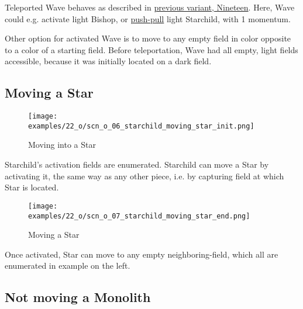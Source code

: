 Teleported Wave behaves as described in
\hyperref[fig:scn_n_04_teleport_move_3]{previous variant, Nineteen}.
Here, Wave could e.g. activate light Bishop, or
\hyperref[sec:Terms/Push-pull activation]{push-pull} light Starchild, with 1 momentum.

Other option for activated Wave is to move to any empty field in color opposite to a
color of a starting field. Before teleportation, Wave had all empty, light fields
accessible, because it was initially located on a dark field.

\clearpage %

\subsection*{Moving a Star}

\vspace*{-0.9\baselineskip}
\noindent
\begin{wrapfigure}[5]{l}{0.4\textwidth}
\centering
\texttt{[image: examples/22\_o/scn\_o\_06\_starchild\_moving\_star\_init.png]}
\caption{Moving into a Star}
\label{fig:scn_o_06_starchild_moving_star_init}
\end{wrapfigure}
Starchild's activation fields are enumerated. Starchild can move a Star by activating it,
the same way as any other piece, i.e. by capturing field at which Star is located.

\vspace*{2.1\baselineskip}
\noindent
\begin{wrapfigure}[4]{l}{0.4\textwidth}
\centering
\texttt{[image: examples/22\_o/scn\_o\_07\_starchild\_moving\_star\_end.png]}
\caption{Moving a Star}
\label{fig:scn_o_07_starchild_moving_star_end}
\end{wrapfigure}
Once activated, Star can move to any empty neighboring-field, which all are enumerated in
example on the left.

\clearpage %

\subsection*{Not moving a Monolith}

